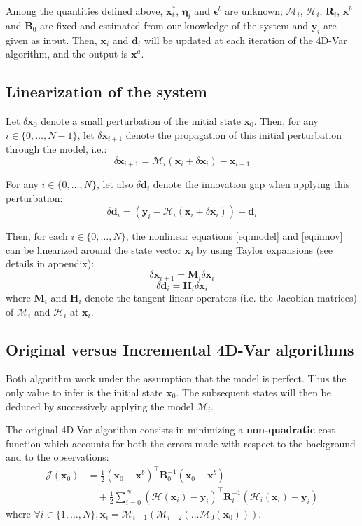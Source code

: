 \documentclass[a4paper,10pt]{article}
\newcommand{\MM}{\mathcal M}
\newcommand{\MH}{\mathcal H}
\newcommand{\MJ}{\mathcal J}
\newcommand{\BR}{{\mathbf R}}
\newcommand{\BB}{{\mathbf B}}
\newcommand{\BH}{{\mathbf H}}
\newcommand{\BM}{{\mathbf M}}
\newcommand{\bx}{{\boldsymbol x}}
\newcommand{\by}{{\boldsymbol y}}
\newcommand{\bd}{{\boldsymbol d}}
\newcommand{\bet}{{\boldsymbol \eta}}
\newcommand{\bep}{{\boldsymbol \epsilon}}
\newcommand{\dx}{\delta \bx}
\newcommand{\dd}{\delta \bd}
\newcommand{\izton}{i \in \{0, \dots, N\}}
\newcommand{\ioton}{i \in \{1, \dots, N\}}
\newcommand{\iztonn}{i \in \{0, \dots, N-1\}}
\newcommand{\sumin}{\sum_{i=0}^{N}}
\begin{document}
Among the quantities defined above, $\bx_i^*$, $\bet_i$ and $\bep^b$ are unknown; $\MM_i$, $\MH_i$, $\BR_i$, $\bx^b$ and $\BB_0$ are fixed and estimated from our knowledge of the system and $\by_i$ are given as input. Then, $\bx_i$ and $\bd_i$ will be updated at each iteration of the 4D-Var algorithm, and the output is $\bx^a$.

\subsection{Linearization of the system}

Let $\dx_0$ denote a small perturbation of the initial state $\bx_0$. Then, for any $\iztonn$, let $\dx_{i+1}$ denote the propagation of this initial perturbation through the model, i.e.:
\begin{equation}
\label{eq:propag}
	\dx_{i+1} = \MM_i(\bx_i + \dx_i) - \bx_{i+1}
\end{equation}

For any $\izton$, let also $\dd_i$ denote the innovation gap when applying this perturbation:
\begin{equation}
\label{eq:innov_gap}
\dd_i = (\by_i - \MH_i(\bx_i + \dx_i)) - \bd_i
\end{equation}

Then, for each $\izton$, the nonlinear equations \eqref{eq:model} and \eqref{eq:innov} can be linearized around the state vector $\bx_i$ by using Taylor expansions (see details in appendix):
\begin{equation}
\label{eq:lin_model_1}
	\dx_{i+1} = \BM_i \dx_i
\end{equation}
\begin{equation}
\label{eq:lin_model_2}
	\dd_i = \BH_i \dx_i
\end{equation}
where $\BM_i$ and $\BH_i$ denote the tangent linear operators (i.e. the Jacobian matrices) of $\MM_i$ and $\MH_i$ at $\bx_i$.

\subsection{Original versus Incremental 4D-Var algorithms}

Both algorithm work under the assumption that the model is perfect. Thus the only value to infer is the initial state $\bx_0$. The subsequent states will then be deduced by successively applying the model $\MM_i$.

The original 4D-Var algorithm consists in minimizing a \textbf{non-quadratic} cost function which accounts for both the errors made with respect to the background and to the observations:
\begin{equation}
\label{eq:cost_fun}
\begin{split}
	\MJ(\bx_0)
		& = \frac{1}{2} (\bx_0 - \bx^b)^\top \BB_0^{-1} (\bx_0 - \bx^b) \\
		& \quad + \frac{1}{2} \sumin (\MH(\bx_i) - \by_i)^\top \BR_i^{-1} (\MH_i(\bx_i) - \by_i)
\end{split}
\end{equation}
where $\forall \ioton, \bx_i = \MM_{i-1}(\MM_{i-2}(\dots\MM_0(\bx_0)))$.
\vspace{10pt}
\end{document}
